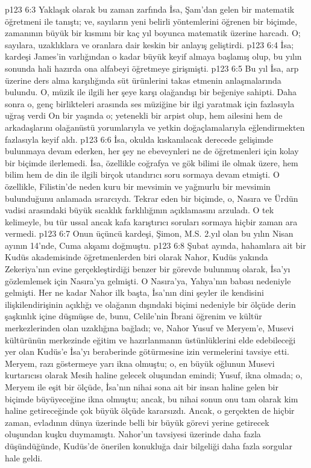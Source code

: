 \vs p123 6:3 Yaklaşık olarak bu zaman zarfında İsa, Şam’dan gelen bir matematik öğretmeni ile tanıştı; ve, sayıların yeni belirli yöntemlerini öğrenen bir biçimde, zamanının büyük bir kısmını bir kaç yıl boyunca matematik üzerine harcadı. O; sayılara, uzaklıklara ve oranlara dair keskin bir anlayış geliştirdi.
\vs p123 6:4 İsa; kardeşi James’in varlığından o kadar büyük keyif almaya başlamış olup, bu yılın sonunda hali hazırda ona alfabeyi öğretmeye girişmişti.
\vs p123 6:5 Bu yıl İsa, arp üzerine ders alma karşılığında süt ürünlerini takas etmenin anlaşmalarında bulundu. O, müzik ile ilgili her şeye karşı olağandışı bir beğeniye sahipti. Daha sonra o, genç birlikteleri arasında ses müziğine bir ilgi yaratmak için fazlasıyla uğraş verdi On bir yaşında o; yetenekli bir arpist olup, hem ailesini hem de arkadaşlarını olağanüstü yorumlarıyla ve yetkin doğaçlamalarıyla eğlendirmekten fazlasıyla keyif aldı.
\vs p123 6:6 İsa, okulda kıskanılacak derecede gelişimde bulunmaya devam ederken, her şey ne ebeveynleri ne de öğretmenleri için kolay bir biçimde ilerlemedi. İsa, özellikle coğrafya ve gök bilimi ile olmak üzere, hem bilim hem de din ile ilgili birçok utandırıcı soru sormaya devam etmişti. O özellikle, Filistin’de neden kuru bir mevsimin ve yağmurlu bir mevsimin bulunduğunu anlamada ısrarcıydı. Tekrar eden bir biçimde, o, Nasıra ve Ürdün vadisi arasındaki büyük sıcaklık farklılığının açıklamasını arzuladı. O tek kelimeyle, bu tür ussal ancak kafa karıştırıcı soruları sormaya hiçbir zaman ara vermedi.
\vs p123 6:7 Onun üçüncü kardeşi, Şimon, M.S. 2.yıl olan bu yılın Nisan ayının 14’nde, Cuma akşamı doğmuştu.
\vs p123 6:8 Şubat ayında, hahamlara ait bir Kudüs akademisinde öğretmenlerden biri olarak Nahor, Kudüs yakında Zekeriya’nın evine gerçekleştirdiği benzer bir görevde bulunmuş olarak, İsa’yı gözlemlemek için Nasıra’ya gelmişti. O Nasıra’ya, Yahya’nın babası nedeniyle gelmişti. Her ne kadar Nahor ilk başta, İsa’nın dini şeyler ile kendisini ilişkilendirişinin açıklığı ve olağanın dışındaki biçimi nedeniyle bir ölçüde derin şaşkınlık içine düşmüşse de, bunu, Celile’nin İbrani öğrenim ve kültür merkezlerinden olan uzaklığına bağladı; ve, Nahor Yusuf ve Meryem’e, Musevi kültürünün merkezinde eğitim ve hazırlanmanın üstünlüklerini elde edebileceği yer olan Kudüs’e İsa’yı beraberinde götürmesine izin vermelerini tavsiye etti. Meryem, razı göstermeye yarı ikna olmuştu; o, en büyük oğlunun Musevi kurtarıcısı olarak Mesih haline gelecek oluşundan emindi; Yusuf, ikna olmada; o, Meryem ile eşit bir ölçüde, İsa’nın nihai sona ait bir insan haline gelen bir biçimde büyüyeceğine ikna olmuştu; ancak, bu nihai sonun onu tam olarak kim haline getireceğinde çok büyük ölçüde kararsızdı. Ancak, o gerçekten de hiçbir zaman, evladının dünya üzerinde belli bir büyük görevi yerine getirecek oluşundan kuşku duymamıştı. Nahor’un tavsiyesi üzerinde daha fazla düşündüğünde, Kudüs’de önerilen konukluğa dair bilgeliği daha fazla sorgular hale geldi.
